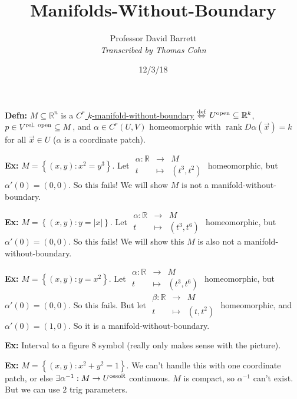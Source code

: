 \documentclass[10pt,letterpaper]{article}
\author{Professor David Barrett\\ \small\textit{Transcribed by Thomas Cohn}}
\title{Manifolds-Without-Boundary}
\date{12/3/18} %
\newcommand{\n}{\hfill\break}
\newcommand{\defn}[1]{\par\noindent\settowidth{\hangindent}{\textbf{Defn: }}\textbf{Defn: }#1\n}
\newcommand{\ex}[1]{\par\noindent\settowidth{\hangindent}{\textbf{Ex: }}\textbf{Ex: }#1\n}
\newcommand{\ptxt}[1]{\textrm{\textnormal{#1}}}
\newcommand{\set}[1]{\left\{#1\right\}}
\newcommand{\reals}{\mathbb{R}}
\newcommand{\R}{\reals}
\newcommand{\inv}{^{-1}}
\newcommand{\abs}[1]{\left|#1\right|}
\DeclareMathOperator{\rank}{rank}
\newcommand{\iffdef}{\overset{\ptxt{def}}{\Leftrightarrow}}
\begin{document}
\maketitle
\setlength\RaggedRightParindent{\parindent}
\RaggedRight

\defn{$M\subseteq\R^{n}$ is a \underline{$C^{r}$ $k$-manifold-without-boundary} $\iffdef$ $U^{\ptxt{open}}\subseteq\R^{k}$, $p\in{}V^{\ptxt{rel. open}}\subseteq{}M$, and\n
$\alpha\in{}C^{r}(U,V)$ homeomorphic with $\rank{}D\alpha(\vec{x})=k$ for all $\vec{x}\in{}U$ ($\alpha$ is a coordinate patch).}

\ex{$M=\set{(x,y):x^{2}=y^{3}}$. Let $\begin{array}{rcl}\alpha:\R & \to & M\\ t & \mapsto & (t^{3},t^{2})\end{array}$ homeomorphic, but $\alpha'(0)=(0,0)$. So this fails! We will show $M$ is not a manifold-without-boundary.}

\ex{$M=\set{(x,y):y=\abs{x}}$. Let $\begin{array}{rcl}\alpha:\R & \to & M\\ t & \mapsto & (t^{3},t^{6})\end{array}$ homeomorphic, but $\alpha'(0)=(0,0)$. So this fails! We will show this $M$ is also not a manifold-without-boundary.}

\ex{$M=\set{(x,y):y=x^{2}}$. Let $\begin{array}{rcl}\alpha:\R & \to & M\\ t & \mapsto & (t^{3},t^{6})\end{array}$ homeomorphic, but $\alpha'(0)=(0,0)$. So this fails.\n
But let $\begin{array}{rcl}\beta:\R & \to & M\\ t & \mapsto & (t,t^{2})\end{array}$ homeomorphic, and $\alpha'(0)=(1,0)$. So it is a manifold-without-boundary.}

\ex{Interval to a figure 8 symbol (really only makes sense with the picture).}

\ex{$M=\set{(x,y):x^{2}+y^{2}=1}$. We can't handle this with one coordinate patch, or else $\exists\alpha\inv:M\to{}U^{\ptxt{osso}\R}$ continuous. $M$ is compact, so $\alpha\inv$ can't exist. But we can use $2$ trig parameters.}
\end{document}
